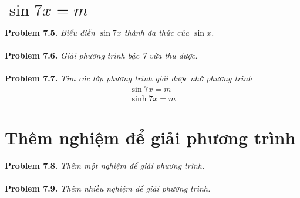 \documentclass[a4paper,oneside]{book}
\numberwithin{equation}{chapter}
\begin{document}
\section{$\sin 7x = m$}
\textbf{Problem 7.5.} \textit{Biểu diễn $\sin 7x$ thành đa thức của $\sin x$.}\\
\\
\textbf{Problem 7.6.} \textit{Giải phương trình bậc 7 vừa thu được.}\\
\\
\textbf{Problem 7.7.} \textit{Tìm các lớp phương trình giải được nhờ phương trình}
\begin{align}
\sin 7x = m\\
\sinh 7x = m
\end{align}
\section{Thêm nghiệm để giải phương trình}
\textbf{Problem 7.8.} \textit{Thêm một nghiệm để giải phương trình.}\\
\\
\textbf{Problem 7.9.} \textit{Thêm nhiều nghiệm để giải phương trình.}
\end{document}
